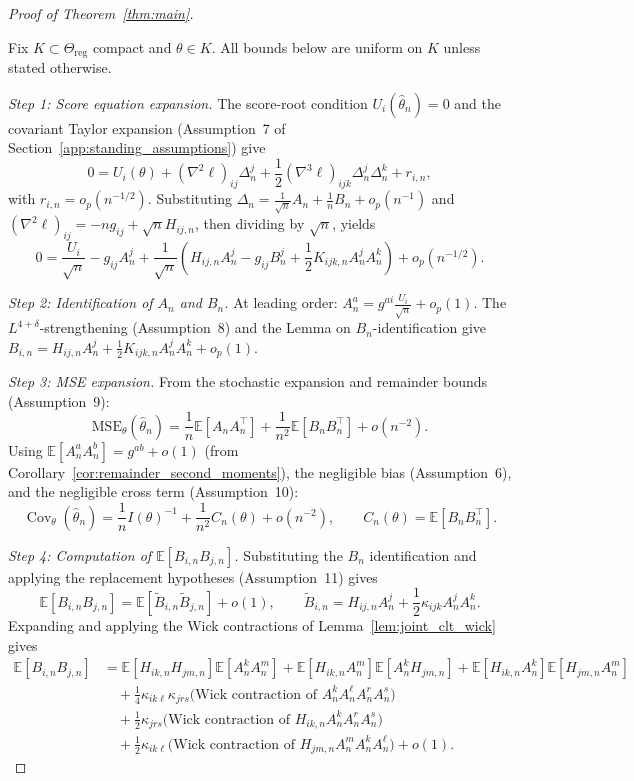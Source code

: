 \documentclass[11pt,letterpaper]{amsart}
\newcommand{\E}{\mathbb{E}}
\DeclareMathOperator{\Cov}{Cov}
\numberwithin{equation}{section}
\theoremstyle{plain}
\theoremstyle{definition}
\theoremstyle{remark}
\begin{document}
\begin{proof}[Proof of Theorem~\ref{thm:main}]
\label{proof:main_detailed}

Fix $K\subset\Theta_{\mathrm{reg}}$ compact and $\theta\in K$. All bounds below are uniform on $K$ unless stated otherwise.

\textit{Step 1: Score equation expansion.}
The score-root condition $U_i(\hat\theta_n)=0$ and the covariant Taylor expansion (Assumption~7 of Section~\ref{app:standing_assumptions}) give
\[
0 = U_i(\theta) + (\nabla^2\ell)_{ij}\Delta_n^j + \frac12(\nabla^3\ell)_{ijk}\Delta_n^j\Delta_n^k + r_{i,n},
\]
with $r_{i,n}=o_p(n^{-1/2})$. Substituting $\Delta_n = \frac1{\sqrt n}A_n+\frac1n B_n+o_p(n^{-1})$ and $(\nabla^2\ell)_{ij}=-ng_{ij}+\sqrt n H_{ij,n}$, then dividing by $\sqrt n$, yields
\[
0 = \frac{U_i}{\sqrt n} - g_{ij}A_n^j + \frac1{\sqrt n}(H_{ij,n}A_n^j - g_{ij}B_n^j + \frac12 K_{ijk,n}A_n^jA_n^k) + o_p(n^{-1/2}).
\]

\textit{Step 2: Identification of $A_n$ and $B_n$.}
At leading order: $A_n^a = g^{ai}\frac{U_i}{\sqrt n}+o_p(1)$. The $L^{4+\delta}$-strengthening (Assumption~8) and the Lemma on $B_n$-identification give $B_{i,n}=H_{ij,n}A_n^j+\frac12 K_{ijk,n}A_n^jA_n^k+o_p(1)$.

\textit{Step 3: MSE expansion.}
From the stochastic expansion and remainder bounds (Assumption~9):
\[
\text{MSE}_\theta(\hat\theta_n) = \frac1n\E[A_nA_n^\top]+\frac1{n^2}\E[B_nB_n^\top]+o(n^{-2}).
\]
Using $\E[A_n^aA_n^b]=g^{ab}+o(1)$ (from Corollary~\ref{cor:remainder_second_moments}), the negligible bias (Assumption~6), and the negligible cross term (Assumption~10):
\[
\Cov_\theta(\hat\theta_n) = \frac1n I(\theta)^{-1} + \frac1{n^2}C_n(\theta)+o(n^{-2}),
\qquad
C_n(\theta)=\E[B_nB_n^\top].
\]

\textit{Step 4: Computation of $\E[B_{i,n}B_{j,n}]$.}
Substituting the $B_n$ identification and applying the replacement hypotheses (Assumption~11) gives
\[
\E[B_{i,n}B_{j,n}] = \E[\widetilde B_{i,n}\widetilde B_{j,n}]+o(1),
\qquad
\widetilde B_{i,n}=H_{ij,n}A_n^j+\frac12\kappa_{ijk}A_n^jA_n^k.
\]
Expanding and applying the Wick contractions of Lemma~\ref{lem:joint_clt_wick} gives
\begin{align*}
\E[B_{i,n}B_{j,n}]
&= \E[H_{ik,n}H_{jm,n}]\E[A_n^kA_n^m]
 + \E[H_{ik,n}A_n^m]\E[A_n^kH_{jm,n}]
 + \E[H_{ik,n}A_n^k]\E[H_{jm,n}A_n^m] \\
&\quad
+ \frac14 \kappa_{ik\ell}\kappa_{jrs}
\big(\text{Wick contraction of }A_n^kA_n^\ell A_n^rA_n^s\big) \\
&\quad
+ \frac12 \kappa_{jrs}
\big(\text{Wick contraction of }H_{ik,n}A_n^kA_n^rA_n^s\big) \\
&\quad
+ \frac12 \kappa_{ik\ell}
\big(\text{Wick contraction of }H_{jm,n}A_n^mA_n^kA_n^\ell\big)
+ o(1).
\end{align*}


\end{proof}
\end{document}
